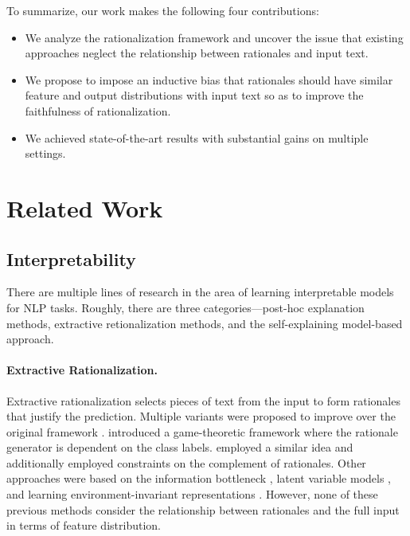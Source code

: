 \documentclass[letterpaper]{article} %
\begin{document}
To summarize, our work makes the following four contributions: 
\begin{itemize}
    \item We analyze the rationalization framework and uncover the issue that existing approaches neglect the relationship between rationales and input text. 
    \item We propose to impose an inductive bias that rationales should have similar feature and output distributions with input text so as to improve the faithfulness of rationalization. 
    \item We achieved state-of-the-art results with substantial gains on multiple settings. %
\end{itemize}

\section{Related Work}
\subsection{Interpretability}
There are multiple lines of research in the area of learning interpretable models for NLP tasks. Roughly, there are three categories---post-hoc explanation methods, extractive retionalization methods, and the self-explaining model-based approach.

\paragraph{Extractive Rationalization.}
Extractive rationalization selects pieces of text from the input to form rationales that justify the prediction. Multiple variants were proposed to improve over the original framework \cite{lei2016rationalizing}. \citet{chang2019game} introduced a game-theoretic framework where the rationale generator is dependent on the class labels. \citet{yu2019rethinking} employed a similar idea and additionally employed constraints on the complement of rationales. Other approaches were based on the information bottleneck \cite{paranjape2020information}, latent variable models \cite{Bastings2019InterpretableNP}, and  learning environment-invariant representations \cite{chang2020invariant}.  However, none of these previous methods consider the relationship between rationales and the full input in terms of feature distribution. 
\end{document}
